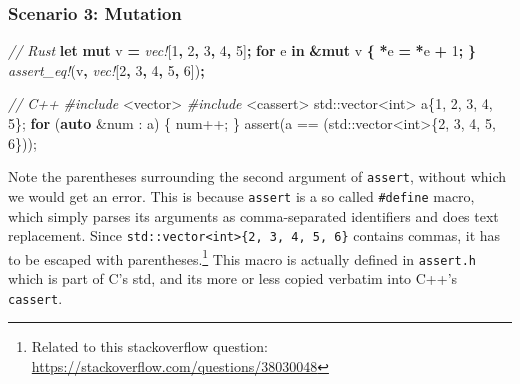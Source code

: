 \documentclass[
]{book}
\newenvironment{Shaded}{\begin{snugshade}}{\end{snugshade}}
\newcommand{\BuiltInTok}[1]{#1}
\newcommand{\CommentTok}[1]{\textcolor[rgb]{0.56,0.35,0.01}{\textit{#1}}}
\newcommand{\ControlFlowTok}[1]{\textcolor[rgb]{0.13,0.29,0.53}{\textbf{#1}}}
\newcommand{\DataTypeTok}[1]{\textcolor[rgb]{0.13,0.29,0.53}{#1}}
\newcommand{\DecValTok}[1]{\textcolor[rgb]{0.00,0.00,0.81}{#1}}
\newcommand{\ImportTok}[1]{#1}
\newcommand{\KeywordTok}[1]{\textcolor[rgb]{0.13,0.29,0.53}{\textbf{#1}}}
\newcommand{\NormalTok}[1]{#1}
\newcommand{\OperatorTok}[1]{\textcolor[rgb]{0.81,0.36,0.00}{\textbf{#1}}}
\newcommand{\OtherTok}[1]{\textcolor[rgb]{0.56,0.35,0.01}{#1}}
\newcommand{\PreprocessorTok}[1]{\textcolor[rgb]{0.56,0.35,0.01}{\textit{#1}}}
\begin{document}
\hypertarget{scenario-3-mutation}{%
\subsubsection{Scenario 3: Mutation}\label{scenario-3-mutation}}

\begin{Shaded}
\begin{Highlighting}[]
\CommentTok{// Rust}
\KeywordTok{let} \KeywordTok{mut}\NormalTok{ v }\OperatorTok{=} \PreprocessorTok{vec!}\NormalTok{[}\DecValTok{1}\OperatorTok{,} \DecValTok{2}\OperatorTok{,} \DecValTok{3}\OperatorTok{,} \DecValTok{4}\OperatorTok{,} \DecValTok{5}\NormalTok{]}\OperatorTok{;}
\KeywordTok{for}\NormalTok{ e }\KeywordTok{in} \OperatorTok{\&}\KeywordTok{mut}\NormalTok{ v }\OperatorTok{\{}
    \OperatorTok{*}\NormalTok{e }\OperatorTok{=} \OperatorTok{*}\NormalTok{e }\OperatorTok{+} \DecValTok{1}\OperatorTok{;}
\OperatorTok{\}}
\PreprocessorTok{assert\_eq!}\NormalTok{(v}\OperatorTok{,} \PreprocessorTok{vec!}\NormalTok{[}\DecValTok{2}\OperatorTok{,} \DecValTok{3}\OperatorTok{,} \DecValTok{4}\OperatorTok{,} \DecValTok{5}\OperatorTok{,} \DecValTok{6}\NormalTok{])}\OperatorTok{;}
\end{Highlighting}
\end{Shaded}

\begin{Shaded}
\begin{Highlighting}[]
\CommentTok{// C++}
\PreprocessorTok{\#include }\ImportTok{\textless{}vector\textgreater{}}
\PreprocessorTok{\#include }\ImportTok{\textless{}cassert\textgreater{}}
\BuiltInTok{std::}\NormalTok{vector\textless{}}\DataTypeTok{int}\NormalTok{\textgreater{} a\{}\DecValTok{1}\NormalTok{, }\DecValTok{2}\NormalTok{, }\DecValTok{3}\NormalTok{, }\DecValTok{4}\NormalTok{, }\DecValTok{5}\NormalTok{\};}
\ControlFlowTok{for}\NormalTok{ (}\KeywordTok{auto}\NormalTok{ \&num : a)}
\NormalTok{\{}
\NormalTok{    num++;}
\NormalTok{\}}
\OtherTok{assert}\NormalTok{(a == (}\BuiltInTok{std::}\NormalTok{vector\textless{}}\DataTypeTok{int}\NormalTok{\textgreater{}\{}\DecValTok{2}\NormalTok{, }\DecValTok{3}\NormalTok{, }\DecValTok{4}\NormalTok{, }\DecValTok{5}\NormalTok{, }\DecValTok{6}\NormalTok{\}));}
\end{Highlighting}
\end{Shaded}

Note the parentheses surrounding the second argument of \texttt{assert}, without which we would get an error. This is because \texttt{assert} is a so called \texttt{\#define} macro, which simply parses its arguments as comma-separated identifiers and does text replacement. Since \texttt{std::vector\textless{}int\textgreater{}\{2,\ 3,\ 4,\ 5,\ 6\}} contains commas, it has to be escaped with parentheses.\footnote{Related to this stackoverflow question: \url{https://stackoverflow.com/questions/38030048}} This macro is actually defined in \texttt{assert.h} which is part of C's std, and its more or less copied verbatim into C++'s \texttt{cassert}.
\end{document}

